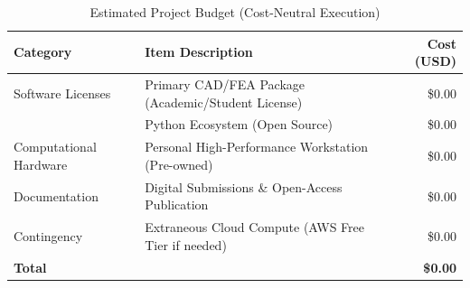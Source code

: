 \begin{table}[H]
    \centering
    \caption{Estimated Project Budget (Cost-Neutral Execution)}
    \label{tab:budget}
    \begin{tabular}{llr}
        \toprule
        \textbf{Category} & \textbf{Item Description} & \textbf{Cost (USD)} \\
        \midrule
        Software Licenses & Primary CAD/FEA Package (Academic/Student License) & \$0.00 \\
         & Python Ecosystem (Open Source) & \$0.00 \\
        Computational Hardware & Personal High-Performance Workstation (Pre-owned) & \$0.00 \\
        Documentation & Digital Submissions \& Open-Access Publication & \$0.00 \\
        Contingency & Extraneous Cloud Compute (AWS Free Tier if needed) & \$0.00 \\
        \midrule
        \textbf{Total} & & \textbf{\$0.00} \\
        \bottomrule
    \end{tabular}
\end{table}

